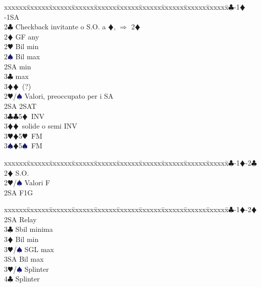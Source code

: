 \documentclass[a4paper,italian]{article}
\newcommand{\BC}{\textcolor{OliveGreen}{$\clubsuit$}}
\newcommand{\BD}{\textcolor{RedOrange}{$\vardiamondsuit$}}
\newcommand{\BH}{\textcolor{Red2}{$\varheartsuit${}}}
\newcommand{\BS}{\textcolor{MidnightBlue}{$\spadesuit${}}}
\newenvironment{bidtable}
{\begin{tabbing}

    xxxxxx\=xxxxxx\=xxxxxx\=xxxxxx\=xxxxxx\=xxxxxx\=xxxxxx\=xxxxxx\=xxxxxx\=xxxxxx\=\kill}
{\end{tabbing} }%
\begin{document}
\begin{multicols}{2}
\begin{bidtable}
                                        1\BC-1\BD-1SA\+\\
                                        2\BC \> Checkback invitante o S.O. a \BD , $\Rightarrow$ 2\BD \\
                                        2\BD \> GF any\+\\
                                        2\BH \> Bil min\\
                                        2\BS \> Bil max\\
                                        2SA  min\\
                                        3\BC {} max\\
                                        3\BD {}\BD\ (?)\-\\
                                        [2pt]2\BH/\BS \> Valori, preoccupato per i SA\\
                                        2SA \> 2SAT\\
                                        3\BC {}\BC 5\BD\ INV\\
                                        3\BD {}\BD\ solide o semi INV\\
                                        3\BH {}\BD 5\BH\ FM\\
                                        3\BS {}\BD 5\BS\ FM\-
                                    \end{bidtable}
                                    \bigbreak
                                    \begin{bidtable}
                                        1\BC-1\BD-2\BC\+\\
                                        2\BD \> S.O.\\
                                        2\BH/\BS \> Valori F\\
                                        2SA \> F1G\-
                                    \end{bidtable}
                                    \bigbreak
                                    \begin{bidtable}
                                        1\BC-1\BD-2\BD\+\\
                                        2SA \> Relay\+\\
                                        3\BC \> Sbil minima\\
                                        3\BD \> Bil min\\
                                        3\BH/\BS \> SGL max\\
                                        3SA \> Bil max\-\\
                                        3\BH/\BS \> Splinter\\
                                        4\BC \> Splinter\-
                                    \end{bidtable}


\end{multicols}
\end{document}
